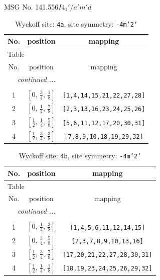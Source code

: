 \documentclass[fleqn,8pt]{jsarticle}
\begin{document}
\setcounter{MaxMatrixCols}{32}

\renewcommand{\tablename}{Table~}
\renewcommand{\figurename}{Figure~}
\begin{center}
\LARGE
MSG No. 141.556\quad$I4_{1}'/a'm'd$
\end{center}
\renewcommand{\arraystretch}{1.2}
\begin{longtable}{ccc}
\caption{Wyckoff site: {\tt 4a}, site symmetry: {\tt -4m'2'}}
 \\
 \hline \hline
No. & position & mapping \\ \hline \endfirsthead

\multicolumn{2}{l}{\tablename\ \thetable{}} \\
 \hline \hline
No. & position & mapping \\ \hline \endhead

 \hline \hline
\multicolumn{2}{r}{\footnotesize\it continued ...} \\ \endfoot

 \hline \hline
\multicolumn{2}{r}{} \\ \endlastfoot

1 & $\left[ 0,\, \frac{3}{4},\, \frac{1}{8} \right]$ & {\tt [1,4,14,15,21,22,27,28]} \\ \hline
2 & $\left[ 0,\, \frac{1}{4},\, \frac{7}{8} \right]$ & {\tt [2,3,13,16,23,24,25,26]} \\ \hline
3 & $\left[ \frac{1}{2},\, \frac{1}{4},\, \frac{5}{8} \right]$ & {\tt [5,6,11,12,17,20,30,31]} \\ \hline
4 & $\left[ \frac{1}{2},\, \frac{3}{4},\, \frac{3}{8} \right]$ & {\tt [7,8,9,10,18,19,29,32]} \\
\end{longtable}
\renewcommand{\arraystretch}{1.2}
\begin{longtable}{ccc}
\caption{Wyckoff site: {\tt 4b}, site symmetry: {\tt -4m'2'}}
 \\
 \hline \hline
No. & position & mapping \\ \hline \endfirsthead

\multicolumn{2}{l}{\tablename\ \thetable{}} \\
 \hline \hline
No. & position & mapping \\ \hline \endhead

 \hline \hline
\multicolumn{2}{r}{\footnotesize\it continued ...} \\ \endfoot

 \hline \hline
\multicolumn{2}{r}{} \\ \endlastfoot

1 & $\left[ 0,\, \frac{1}{4},\, \frac{3}{8} \right]$ & {\tt [1,4,5,6,11,12,14,15]} \\ \hline
2 & $\left[ 0,\, \frac{3}{4},\, \frac{5}{8} \right]$ & {\tt [2,3,7,8,9,10,13,16]} \\ \hline
3 & $\left[ \frac{1}{2},\, \frac{3}{4},\, \frac{7}{8} \right]$ & {\tt [17,20,21,22,27,28,30,31]} \\ \hline
4 & $\left[ \frac{1}{2},\, \frac{1}{4},\, \frac{1}{8} \right]$ & {\tt [18,19,23,24,25,26,29,32]} \\
\end{longtable}
\end{document}
